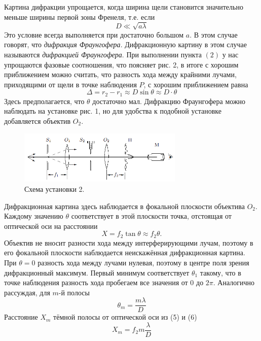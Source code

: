 \documentclass[a4paper,12pt]{article}
\begin{document}
	Картина дифракции упрощается, когда ширина щели становится значительно меньше ширины первой зоны Френеля, т.е. если 
	\begin{equation}
	D \ll\sqrt{a \lambda} 
	\end{equation}	
	Это условие всегда выполняется при достаточно большом $a$. В этом случае говорят, что \textit{дифракция Фраунгофера}. Дифракционную картину в этом случае называются \textit{дифракцией Фраунгофера}. При выполнении пункта $(2)$ у нас упрощаются фазовые соотношения, что поясняет рис. 2, в итоге с хорошим приближением можно считать, что разность хода между крайними лучами, приходящими от щели в точке наблюдения $P$, с хорошим приближением равна 
	\begin{equation}
	\Delta = r_2 - r_1 \approx D \sin \theta \approx D \cdot \theta
	\end{equation}
	Здесь предполагается, что $\theta$ достаточно мал.
	Дифракцию Фраунгофера можно наблюдать на установке рис. 1, но для удобства к подобной установке добавляется объектив $O_2$.
	
	\begin{figure}[h]
		\includegraphics[width = 0.7\textwidth]{431-4.png}
		\centering
		\caption{Схема установки 2.}
	\end{figure}
	Дифракционная картина здесь наблюдается в фокальной плоскости объектива $O_2$. Каждому значению $\theta$ соответствует в этой плоскости точка, отстоящая от оптической оси на расстоянии 
	\begin{equation}
	X = f_2 \tan \theta \approx f_2 \theta.
	\end{equation}
	Объектив не вносит разности хода между интерферирующими лучам, поэтому в его фокальной плоскости наблюдается неискажённая дифракционная картина. При $\theta = 0$ разность хода между лучами нулевая, поэтому в центре поля зрения дифракционный максимум. Первый минимум соответствует $\theta_1$ такому, что в точке наблюдения разность хода пробегаем все значения от 0 до $2\pi$. Аналогично рассуждая, для $m$-й полосы
	\begin{equation}
	\theta_m = \frac{m \lambda}{D}
	\end{equation}
	Расстояние $X_m$ тёмной полосы от оптической оси из (5) и (6)
	\begin{equation}
	X_m = f_2m\frac{\lambda}{D}
	\end{equation}
\end{document}
